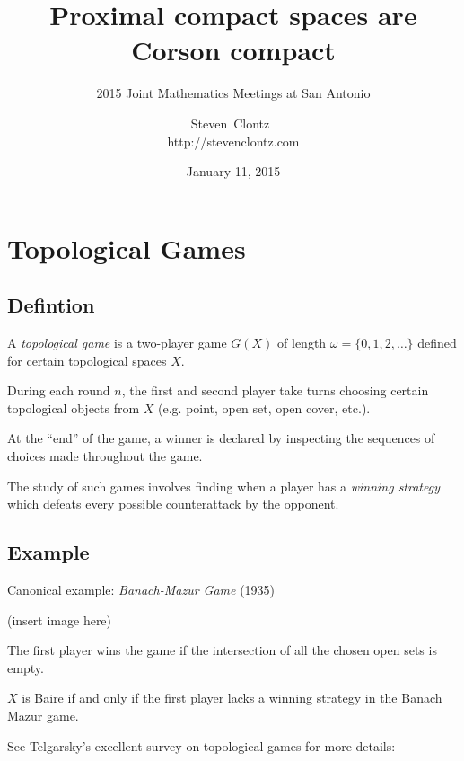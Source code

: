 \documentclass{beamer}
\title
{Proximal compact spaces are Corson compact}
\subtitle
{2015 Joint Mathematics Meetings at San Antonio} %
\author%
{Steven~Clontz~\\http://stevenclontz.com}%
\institute[Auburn University] %
{
  Department of Mathematics and Statistics\\
  Auburn University}
\date[15-01-11] %
{January 11, 2015}
\theoremstyle{definition}
\newcommand{\<}{\langle}
\renewcommand{\>}{\rangle}
\newcommand{\term}{\textit}
\begin{document}
\renewcommand{\pause}{}
\newcommand{\vspacing}{\vspace{1em}}
\newcommand{\vpause}{\pause\vspacing}

\begin{frame}
  \titlepage
\end{frame}

\section{Topological Games}

\subsection{Defintion}

\begin{frame}
  A \term{topological game} is a two-player game $G(X)$ of length
  $\omega=\{0,1,2,\dots\}$ defined for certain topological spaces $X$.

  \vpause

  During each round $n$, the first and second player take turns choosing
  certain topological objects from $X$ (e.g. point, open set, open cover, etc.).

  \vpause

  At the ``end'' of the game, a winner is declared by inspecting the sequences
  of choices made throughout the game.

  \vpause

  The study of such games involves finding when a player has a
  \term{winning strategy} which defeats every possible counterattack by
  the opponent.
\end{frame}

\subsection{Example}

\begin{frame}
  Canonical example: \term{Banach-Mazur Game} (1935) \cite{MR666400}

  \vspacing

  (insert image here)

  \vpause

  The first player wins the game if the intersection of all the chosen
  open sets is empty.

  \pause

  \begin{theorem}
    $X$ is Baire if and only if the first player lacks a winning strategy
    in the Banach Mazur game.
  \end{theorem}

  See Telgarsky's excellent survey on topological games for more
  details: \cite{MR892457}
\end{frame}
\end{document}
